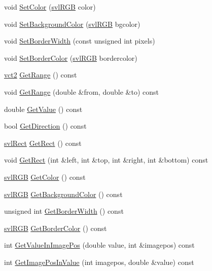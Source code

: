 \begin{DoxyCompactItemize}
\item 
void \hyperlink{classsvl_overlay_static_bar_a1742ec191bd0a3d669d50886f5001322}{Set\+Color} (\hyperlink{structsvl_r_g_b}{svl\+R\+G\+B} color)
\item 
void \hyperlink{classsvl_overlay_static_bar_afe51822052b88ee25f82c8c92978c2ff}{Set\+Background\+Color} (\hyperlink{structsvl_r_g_b}{svl\+R\+G\+B} bgcolor)
\item 
void \hyperlink{classsvl_overlay_static_bar_a49439436a1c7cf6fb6df040010a14a57}{Set\+Border\+Width} (const unsigned int pixels)
\item 
void \hyperlink{classsvl_overlay_static_bar_a1091a5db22ba4897ab10d8332fcfcae8}{Set\+Border\+Color} (\hyperlink{structsvl_r_g_b}{svl\+R\+G\+B} bordercolor)
\item 
\hyperlink{vct_fixed_size_vector_types_8h_a88481ac3c794867ba5e4e92624f0d958}{vct2} \hyperlink{classsvl_overlay_static_bar_a6652291c391a869141ecab8a2b34e559}{Get\+Range} () const 
\item 
void \hyperlink{classsvl_overlay_static_bar_a331674cb3f309f1f5e833bce5c9d7342}{Get\+Range} (double \&from, double \&to) const 
\item 
double \hyperlink{classsvl_overlay_static_bar_a98ed4083a0b9303dd0df841140e18a49}{Get\+Value} () const 
\item 
bool \hyperlink{classsvl_overlay_static_bar_a388519c550f3102ef0c7fbffe4afb1e9}{Get\+Direction} () const 
\item 
\hyperlink{structsvl_rect}{svl\+Rect} \hyperlink{classsvl_overlay_static_bar_afe7c2f05bfbf77fb571a9a75892cd8d1}{Get\+Rect} () const 
\item 
void \hyperlink{classsvl_overlay_static_bar_ad7e626e120a6b3a58b7b5b1f6f37e33c}{Get\+Rect} (int \&left, int \&top, int \&right, int \&bottom) const 
\item 
\hyperlink{structsvl_r_g_b}{svl\+R\+G\+B} \hyperlink{classsvl_overlay_static_bar_a7da9a6ec2e95cfc0c5114a20a9f78d17}{Get\+Color} () const 
\item 
\hyperlink{structsvl_r_g_b}{svl\+R\+G\+B} \hyperlink{classsvl_overlay_static_bar_a80be61d5d70e6ecd29bd71734a8f54de}{Get\+Background\+Color} () const 
\item 
unsigned int \hyperlink{classsvl_overlay_static_bar_a6d83a014c144d31d9e09090f72ae7a55}{Get\+Border\+Width} () const 
\item 
\hyperlink{structsvl_r_g_b}{svl\+R\+G\+B} \hyperlink{classsvl_overlay_static_bar_a38ae1dc8457696e27ea4fbb8937bc5f4}{Get\+Border\+Color} () const 
\item 
int \hyperlink{classsvl_overlay_static_bar_a2964e9c74091eb342126df5bbe37da34}{Get\+Value\+In\+Image\+Pos} (double value, int \&imagepos) const 
\item 
int \hyperlink{classsvl_overlay_static_bar_a0a8cda260ff1f145d0527012f9823e9a}{Get\+Image\+Pos\+In\+Value} (int imagepos, double \&value) const 
\end{DoxyCompactItemize}
